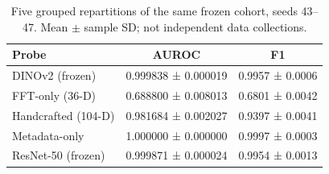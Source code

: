 \begin{table}[t]\caption{Five grouped repartitions of the same frozen cohort, seeds 43--47. Mean $\pm$ sample SD; not independent data collections.}\label{tab:seeds}\centering\footnotesize\begin{tabular}{lcc}\toprule
\textbf{Probe} & \textbf{AUROC} & \textbf{F1}\\\midrule
{}DINOv2 (frozen) & 0.999838 ± 0.000019 & 0.9957 ± 0.0006\\
{}FFT-only (36-D) & 0.688800 ± 0.008013 & 0.6801 ± 0.0042\\
{}Handcrafted (104-D) & 0.981684 ± 0.002027 & 0.9397 ± 0.0041\\
{}Metadata-only & 1.000000 ± 0.000000 & 0.9997 ± 0.0003\\
{}ResNet-50 (frozen) & 0.999871 ± 0.000024 & 0.9954 ± 0.0013\\
\bottomrule\end{tabular}\end{table}